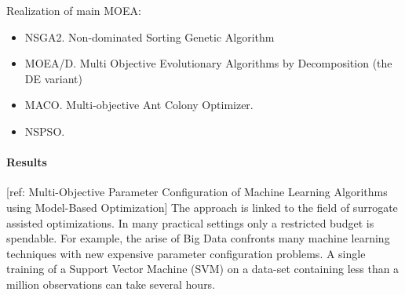     Realization of main MOEA:
    \begin{itemize}
        \item NSGA2. Non-dominated Sorting Genetic Algorithm
        \item MOEA/D. Multi Objective Evolutionary Algorithms by Decomposition (the DE variant)
        \item MACO. Multi-objective Ant Colony Optimizer.
        \item NSPSO. 
    \end{itemize}




\paragraph{Results} [ref: Multi-Objective Parameter Configuration of Machine Learning Algorithms using Model-Based Optimization]
The approach is linked to the field of surrogate assisted optimizations. In many practical settings only a restricted budget is spendable. For example, the arise of Big Data confronts many machine learning techniques with new expensive parameter configuration problems. A single training of a Support Vector Machine (SVM) on a data-set containing less than a million observations can take several hours.